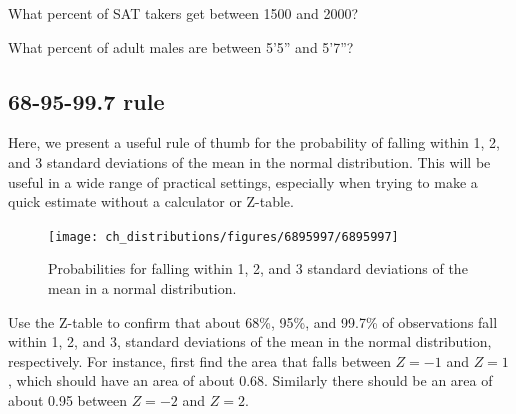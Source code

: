 \begin{exercisewrap}
\begin{nexercise}
What percent of SAT takers get between 1500 and 2000?\footnotemark
\end{nexercise}
\end{exercisewrap}

\begin{exercisewrap}
\begin{nexercise}
What percent of adult males are between 5'5'' and 5'7''?\footnotemark
\end{nexercise}
\end{exercisewrap}



\subsection{68-95-99.7 rule}

Here, we present a useful rule of thumb for the probability of falling within 1, 2, and 3 standard deviations of the mean in the normal distribution. This will be useful in a wide range of practical settings, especially when trying to make a quick estimate without a calculator or Z-table.

\begin{figure}[hht]
\centering
\texttt{[image: ch\_distributions/figures/6895997/6895997]}
\caption{Probabilities for falling within 1, 2, and 3 standard deviations of the mean in a normal distribution.}
\label{6895997}
\end{figure}

\begin{exercisewrap}
\begin{nexercise}
Use the Z-table to confirm that about 68\%, 95\%, and 99.7\% of observations fall within 1, 2, and 3, standard deviations of the mean in the normal distribution, respectively. For instance, first find the area that falls between $Z=-1$ and $Z=1$, which should have an area of about 0.68. Similarly there should be an area of about 0.95 between $Z=-2$ and $Z=2$.\footnotemark
\end{nexercise}
\end{exercisewrap}

